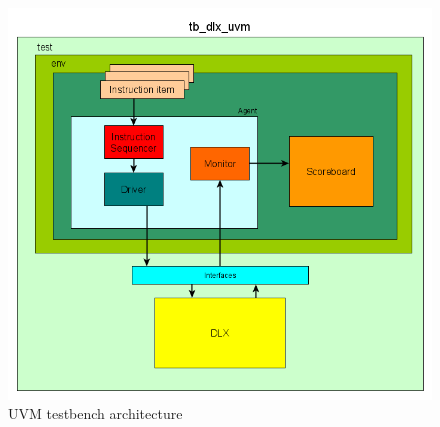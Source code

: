 \begin{figure}[!htbp]
\centering
\captionsetup{justification=centering}
\includegraphics[scale=0.5,angle=0]{./chapters/figures/tb_dlx_uvm.png}
\caption{UVM testbench architecture}
\label{fig:tbuvm}
\end{figure}

